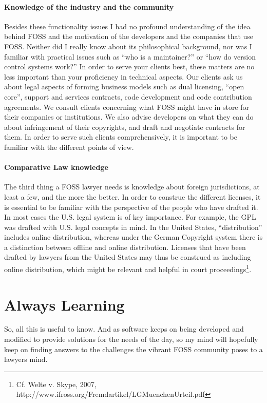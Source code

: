 \paragraph*{Knowledge of the industry and the community}
Besides these functionality issues I had no profound understanding of the idea
behind FOSS and the motivation of the developers and the companies that use
FOSS. Neither did I really know about its philosophical background, nor was I
familiar with practical issues such as “who is a maintainer?” or “how do version
control systems work?” In order to serve your clients best, these matters are no
less important than your proficiency in technical aspects.  
Our clients ask us about legal aspects of forming business models such as dual
licensing, “open core”, support and services contracts, code development and
code contribution agreements. We consult clients concerning what FOSS might have
in store for their companies or institutions. We also advise developers on what
they can do about infringement of their copyrights, and draft and negotiate
contracts for them. In order to serve such clients comprehensively, it is
important to be familiar with the different points of view.  

\paragraph*{Comparative Law knowledge}
The third thing a FOSS lawyer needs is knowledge about foreign jurisdictions, at
least a few, and the more the better. In order to construe the different
licenses, it is essential to be familiar with the perspective of the people who
have drafted it. In most cases the U.S. legal system is of key importance. For
example, the GPL was drafted with U.S. legal concepts in mind. In the United
States, “distribution” includes online distribution, whereas under the German
Copyright system there is a distinction between offline and online distribution.
Licenses that have been drafted by lawyers from the United States may thus be
construed as including online distribution, which might be relevant and helpful
in court proceedings\footnote{Cf. Welte v. Skype, 2007, 
http://www.ifross.org/Fremdartikel/LGMuenchenUrteil.pdf}.
 
\section*{Always Learning}
So, all this is useful to know. And as software keeps on being developed and
modified to provide solutions for the needs of the day, so my mind will
hopefully keep on finding answers to the challenges the vibrant FOSS community
poses to a lawyers mind.